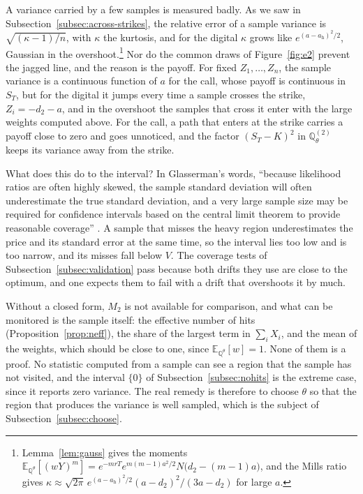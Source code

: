 \documentclass[11pt,a4paper]{article}
\theoremstyle{plain}
\theoremstyle{definition}
\theoremstyle{remark}
\newcommand{\E}{\mathbb{E}}
\newcommand{\Q}{\mathbb{Q}}
\newcommand{\1}{\mathbf{1}}
\newcommand{\Qt}{\Q^{\theta}}
\begin{document}
A variance carried by a few samples is measured badly. As we saw in Subsection~\ref{subsec:across-strikes}, the relative error of a sample variance is $\sqrt{(\kappa - 1)/n}$, with $\kappa$ the kurtosis, and for the digital $\kappa$ grows like $e^{(a - a_{\mathrm h})^2/2}$, Gaussian in the overshoot.\footnote{Lemma~\ref{lem:gauss} gives the moments $\E_{\Qt}[(wY)^m] = e^{-mrT}e^{m(m-1)a^2/2}N\bigl(d_2 - (m-1)a\bigr)$, and the Mills ratio gives $\kappa \approx \sqrt{2\pi}\,e^{(a - a_{\mathrm h})^2/2}(a - d_2)^2/(3a - d_2)$ for large $a$.} Nor do the common draws of Figure~\ref{fig:e2} prevent the jagged line, and the reason is the payoff. For fixed $Z_1, \dots, Z_n$, the sample variance is a continuous function of $a$ for the call, whose payoff is continuous in $S_T$, but for the digital it jumps every time a sample crosses the strike, $Z_i = -d_2 - a$, and in the overshoot the samples that cross it enter with the large weights computed above. For the call, a path that enters at the strike carries a payoff close to zero and goes unnoticed, and the factor $(S_T - K)^2$ in $\Q^{(2)}_\theta$ keeps its variance away from the strike.

What does this do to the interval? In Glasserman's words, ``because likelihood ratios are often highly skewed, the sample standard deviation will often underestimate the true standard deviation, and a very large sample size may be required for confidence intervals based on the central limit theorem to provide reasonable coverage'' \cite[\S 4.6.1, p.~260]{glasserman}. A sample that misses the heavy region underestimates the price and its standard error at the same time, so the interval lies too low and is too narrow, and its misses fall below $V$. The coverage tests of Subsection~\ref{subsec:validation} pass because both drifts they use are close to the optimum, and one expects them to fail with a drift that overshoots it by much.

Without a closed form, $M_2$ is not available for comparison, and what can be monitored is the sample itself: the effective number of hits (Proposition~\ref{prop:neff}), the share of the largest term in $\sum_i X_i$, and the mean of the weights, which should be close to one, since $\E_{\Qt}[w] = 1$. None of them is a proof. No statistic computed from a sample can see a region that the sample has not visited, and the interval $\{0\}$ of Subsection~\ref{subsec:nohits} is the extreme case, since it reports zero variance. The real remedy is therefore to choose $\theta$ so that the region that produces the variance is well sampled, which is the subject of Subsection~\ref{subsec:choose}.
\end{document}
